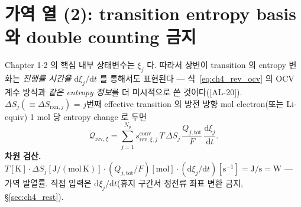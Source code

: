 \documentclass[11pt,a4paper]{article}
\newcommand{\dd}{\mathrm{d}}
\newcommand{\tot}{\mathrm{tot}}
\newcommand{\rev}{\mathrm{rev}}
\newcommand{\rxn}{\mathrm{rxn}}
\newcommand{\conv}{\mathrm{conv}}
\newcommand{\AL}[1]{\textsf{[AL-#1]}}
\begin{document}
\section{가역 열 (2): transition entropy basis 와 double counting 금지}\label{sec:ch4_revxi}
Chapter 1$\cdot$2 의 핵심 내부 상태변수는 $\xi_j$ 다. 따라서 상변이 transition 의 entropy 변화는 \emph{진행률
시간율} $\dd\xi_j/\dd t$ 를 통해서도 표현된다 — 식~\eqref{eq:ch4_rev_ocv} 의 OCV 계수 방식과 \emph{같은 entropy
정보}를 더 미시적으로 쓴 것이다(\AL{20}). $\Delta S_j(\equiv\Delta S_{\rxn,j})$ = $j$번째 effective transition
의 방전 방향 mol electron(또는 Li-equiv) 1 mol 당 entropy change 로 두면
\begin{equation}
\dot{\mathcal Q}_{\rev,\xi}=\sum_{j=1}^{N_p}s_{\rev,\xi,j}^{\conv}\,T\,\Delta S_j\,\frac{Q_{j,\tot}}{F}\,\frac{\dd\xi_j}{\dd t}.
\label{eq:ch4_rev_xi}
\end{equation}
\textbf{차원 검산.} $T[\mathrm K]\cdot\Delta S_j[\mathrm{J/(mol\,K)}]\cdot(Q_{j,\tot}/F)[\mathrm{mol}]\cdot
(\dd\xi_j/\dd t)[\mathrm{s^{-1}}]=\mathrm{J/s}=\mathrm W$ — 가역 발열률. 직접 입력은 $\dd\xi_j/\dd t$(휴지 구간서
정전류 좌표 변환 금지, \S\ref{sec:ch4_rest}).
\end{document}
